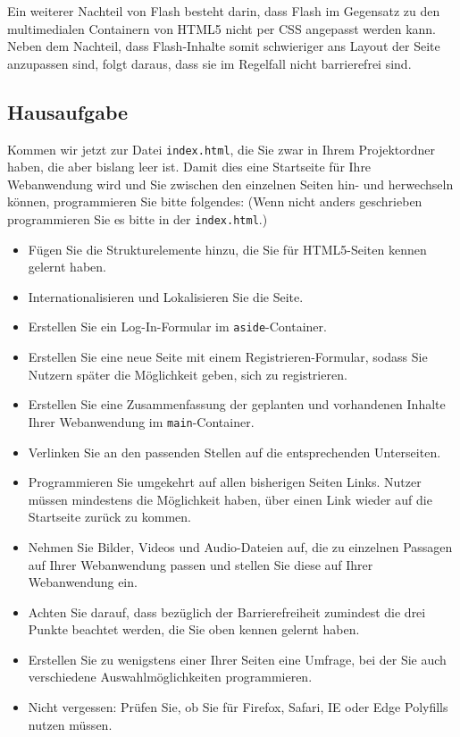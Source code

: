 Ein weiterer Nachteil von Flash besteht darin, dass Flash im Gegensatz zu den multimedialen Containern von HTML5 nicht per CSS angepasst werden kann. Neben dem Nachteil, dass Flash-Inhalte somit schwieriger ans Layout der Seite anzupassen sind, folgt daraus, dass sie im Regelfall nicht barrierefrei sind.

\subsection{Hausaufgabe}

Kommen wir jetzt zur Datei \verb|index.html|, die Sie zwar in Ihrem Projektordner haben, die aber bislang leer ist. Damit dies eine Startseite für Ihre Webanwendung wird und Sie zwischen den einzelnen Seiten hin- und herwechseln können, programmieren Sie bitte folgendes: (Wenn nicht anders geschrieben programmieren Sie es bitte in der \verb|index.html|.)

\begin{itemize}
	\item Fügen Sie die Strukturelemente hinzu, die Sie für HTML5-Seiten kennen gelernt haben.
	\item Internationalisieren und Lokalisieren Sie die Seite.
	\item Erstellen Sie ein Log-In-Formular im \verb|aside|-Container.
	\item Erstellen Sie eine neue Seite mit einem Registrieren-Formular, sodass Sie Nutzern später die Möglichkeit geben, sich zu registrieren. 
	\item Erstellen Sie eine Zusammenfassung der geplanten und vorhandenen Inhalte Ihrer Webanwendung im \verb|main|-Container.
	\item Verlinken Sie an den passenden Stellen auf die entsprechenden Unterseiten.
	\item Programmieren Sie umgekehrt auf allen bisherigen Seiten Links. Nutzer müssen mindestens die Möglichkeit haben, über einen Link wieder auf die Startseite zurück zu kommen.
	\item Nehmen Sie Bilder, Videos und Audio-Dateien auf, die zu einzelnen Passagen auf Ihrer Webanwendung passen und stellen Sie diese auf Ihrer Webanwendung ein.
	\item Achten Sie darauf, dass bezüglich der Barrierefreiheit zumindest die drei Punkte beachtet werden, die Sie oben kennen gelernt haben.
	\item Erstellen Sie zu wenigstens einer Ihrer Seiten eine Umfrage, bei der Sie auch verschiedene Auswahlmöglichkeiten programmieren.
	\item Nicht vergessen: Prüfen Sie, ob Sie für Firefox, Safari, IE oder Edge Polyfills nutzen müssen.
\end{itemize}

